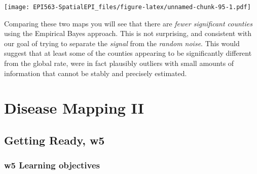 \documentclass[
]{book}
\begin{document}
\texttt{[image: EPI563-SpatialEPI\_files/figure-latex/unnamed-chunk-95-1.pdf]}

Comparing these two maps you will see that there are \emph{fewer significant counties} using the Empirical Bayes approach. This is not surprising, and consistent with our goal of trying to separate the \emph{signal} from the \emph{random noise}. This would suggest that at least some of the counties appearing to be significantly different from the global rate, were in fact plausibly outliers with small amounts of information that cannot be stably and precisely estimated.

\hypertarget{disease-mapping-ii}{%
\chapter{Disease Mapping II}\label{disease-mapping-ii}}

\hypertarget{getting-ready-w5}{%
\section{Getting Ready, w5}\label{getting-ready-w5}}

\hypertarget{w5-learning-objectives}{%
\subsection{w5 Learning objectives}\label{w5-learning-objectives}}

 
  \providecommand{\huxb}[2]{\arrayrulecolor[RGB]{#1}\global\arrayrulewidth=#2pt}
  \providecommand{\huxvb}[2]{\color[RGB]{#1}\vrule width #2pt}
  \providecommand{\huxtpad}[1]{\rule{0pt}{#1}}
  \providecommand{\huxbpad}[1]{\rule[-#1]{0pt}{#1}}
\end{document}
